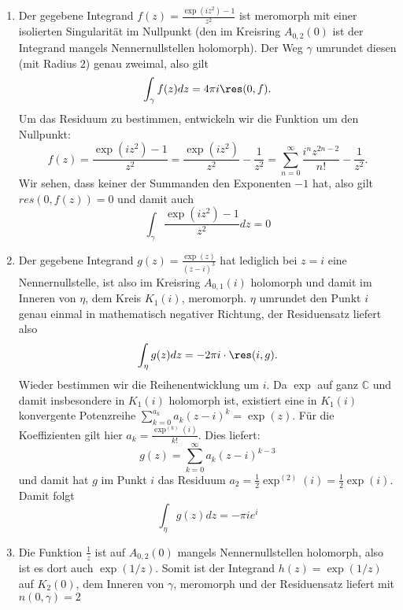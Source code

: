 \documentclass[a4paper]{article}
\begin{document}
\begin{enumerate}
	\item Der gegebene Integrand $f(z) = \frac{\exp(iz^2) - 1}{z^2}$ ist meromorph mit einer isolierten Singularität im Nullpunkt (den im Kreisring $A_{0,2}(0)$ ist der Integrand mangels Nennernullstellen holomorph). Der Weg $\gamma$ umrundet diesen (mit Radius $2$) genau zweimal, also gilt
	\begin{equation*}
		\int_\gamma f(z) dz = 4 \pi i \res(0, f)\text{.}
	\end{equation*}
	Um das Residuum zu bestimmen, entwickeln wir die Funktion um den Nullpunkt:
	\begin{equation*}
		f(z) = \frac{\exp(iz^2) - 1}{z^2} = \frac{\exp(iz^2)}{z^2} - \frac{1}{z^2} = \sum_{n = 0}^{\infty} \frac{i^n z^{2n - 2}}{n!} - \frac{1}{z^2}\text{.}
	\end{equation*}
	Wir sehen, dass keiner der Summanden den Exponenten $-1$ hat, also gilt $res(0, f(z)) = 0$ und damit auch
	\begin{equation*}
		\int_{\gamma} \frac{\exp(iz^2) - 1}{z^2} dz = 0
	\end{equation*}
	\item Der gegebene Integrand $g(z) = \frac{\exp(z)}{(z-i)^3}$ hat lediglich bei $z = i$ eine Nennernullstelle, ist also im Kreisring $A_{0,1}(i)$ holomorph und damit im Inneren von $\eta$, dem Kreis $K_1(i)$, meromorph. $\eta$ umrundet den Punkt $i$ genau einmal in mathematisch negativer Richtung, der Residuensatz liefert also
	\begin{equation*}
		\int_\eta g(z) dz = - 2 \pi i \cdot \res (i, g)\text{.}
	\end{equation*}
	Wieder bestimmen wir die Reihenentwicklung um $i$. Da $\exp$ auf ganz $\mathds{C}$ und damit insbesondere in $K_1(i)$ holomorph ist, existiert eine in $K_1(i)$ konvergente Potenzreihe $\sum_{k =0}^{a_k} a_k (z-i)^k = \exp(z) $. Für die Koeffizienten gilt hier $a_k = \frac{\exp^{(k)}(i)}{k!}$. Dies liefert:
	\begin{equation*}
		g(z) = \sum_{k =0}^{\infty} a_k (z-i)^{k-3} 
	\end{equation*}
	und damit hat $g$ im Punkt $i$ das Residuum $a_2 = \frac{1}{2} \exp^{(2)}(i) = \frac{1}{2} \exp(i)$. Damit folgt
	\begin{equation*}
		\int_\eta g(z) dz = - \pi i e^i
	\end{equation*}
	\item Die Funktion $\frac{1}{z}$ ist auf $A_{0,2}(0)$ mangels Nennernullstellen holomorph, also ist es dort auch $\exp(1/z)$. Somit ist der Integrand $h(z) = \exp(1/z)$ auf $K_2(0)$, dem Inneren von $\gamma$, meromorph und der Residuensatz liefert mit $n(0, \gamma) = 2$

\end{enumerate}
\end{document}

